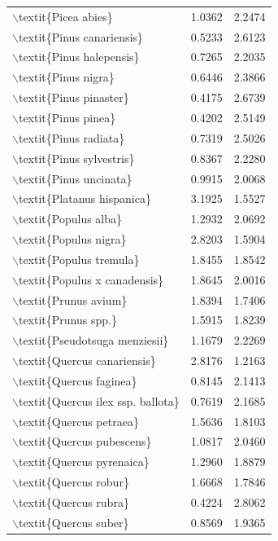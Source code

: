 \begin{table}[ht]
\begin{tabular}{lrr}
  $\backslash$textit\{Picea abies\} & 1.0362 & 2.2474 \\ 
  $\backslash$textit\{Pinus canariensis\} & 0.5233 & 2.6123 \\ 
  $\backslash$textit\{Pinus halepensis\} & 0.7265 & 2.2035 \\ 
  $\backslash$textit\{Pinus nigra\} & 0.6446 & 2.3866 \\ 
  $\backslash$textit\{Pinus pinaster\} & 0.4175 & 2.6739 \\ 
  $\backslash$textit\{Pinus pinea\} & 0.4202 & 2.5149 \\ 
  $\backslash$textit\{Pinus radiata\} & 0.7319 & 2.5026 \\ 
  $\backslash$textit\{Pinus sylvestris\} & 0.8367 & 2.2280 \\ 
  $\backslash$textit\{Pinus uncinata\} & 0.9915 & 2.0068 \\ 
  $\backslash$textit\{Platanus hispanica\} & 3.1925 & 1.5527 \\ 
  $\backslash$textit\{Populus alba\} & 1.2932 & 2.0692 \\ 
  $\backslash$textit\{Populus nigra\} & 2.8203 & 1.5904 \\ 
  $\backslash$textit\{Populus tremula\} & 1.8455 & 1.8542 \\ 
  $\backslash$textit\{Populus x canadensis\} & 1.8645 & 2.0016 \\ 
  $\backslash$textit\{Prunus avium\} & 1.8394 & 1.7406 \\ 
  $\backslash$textit\{Prunus spp.\} & 1.5915 & 1.8239 \\ 
  $\backslash$textit\{Pseudotsuga menziesii\} & 1.1679 & 2.2269 \\ 
  $\backslash$textit\{Quercus canariensis\} & 2.8176 & 1.2163 \\ 
  $\backslash$textit\{Quercus faginea\} & 0.8145 & 2.1413 \\ 
  $\backslash$textit\{Quercus ilex ssp. ballota\} & 0.7619 & 2.1685 \\ 
  $\backslash$textit\{Quercus petraea\} & 1.5636 & 1.8103 \\ 
  $\backslash$textit\{Quercus pubescens\} & 1.0817 & 2.0460 \\ 
  $\backslash$textit\{Quercus pyrenaica\} & 1.2960 & 1.8879 \\ 
  $\backslash$textit\{Quercus robur\} & 1.6668 & 1.7846 \\ 
  $\backslash$textit\{Quercus rubra\} & 0.4224 & 2.8062 \\ 
  $\backslash$textit\{Quercus suber\} & 0.8569 & 1.9365 \\ 

\end{tabular}
\end{table}
